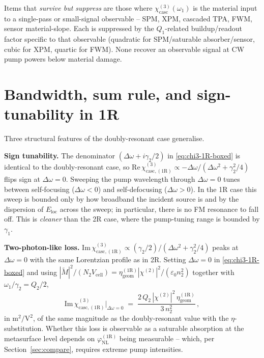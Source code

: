 \documentclass[11pt,a4paper]{article}
\newcommand{\eps}{\varepsilon}
\newcommand{\chitwo}{\chi^{(2)}}
\newcommand{\Dom}{\Delta\omega}
\newcommand{\chicascOneR}{\chi^{(3)}_{\text{casc},(1\mathrm R)}}
\newcommand{\chicasc}{\chi^{(3)}_{\text{casc}}}
\newcommand{\Vunit}{V_{\text{cell}}}
\begin{document}
Items that \emph{survive but suppress} are those where $\chicasc(\omega_1)$
is the material input to a single-pass or small-signal observable -- SPM,
XPM, cascaded TPA, FWM, sensor material-slope.  Each is suppressed by
the $Q_1$-related buildup/readout factor specific to that observable
(quadratic for SPM/saturable absorber/sensor, cubic for XPM, quartic for
FWM).  None recover an observable signal at CW pump powers below
material damage.

\section{Bandwidth, sum rule, and sign-tunability in 1R}\label{sec:sum-1R}

Three structural features of the doubly-resonant case generalise.

\textbf{Sign tunability.}  The denominator $(\Dom+i\gamma_2/2)$ in
\eqref{eq:chi3-1R-boxed} is identical to the doubly-resonant case, so
$\mathrm{Re}\,\chicascOneR\propto-\Dom/(\Dom^{2}+
\gamma_2^{2}/4)$ flips sign at $\Dom=0$.  Sweeping the pump wavelength
through $\Dom=0$ tunes between self-focusing ($\Dom<0$) and self-defocusing
($\Dom>0$).  In the 1R case this sweep is bounded only by how broadband the
incident source is and by the dispersion of $E_\text{loc}$ across the
sweep; in particular, there is no FM resonance to fall off.  This is
\emph{cleaner} than the 2R case, where the pump-tuning range is bounded by
$\gamma_1$.

\textbf{Two-photon-like loss.}
$\mathrm{Im}\,\chicascOneR\propto(\gamma_2/2)/
(\Dom^{2}+\gamma_2^{2}/4)$ peaks at $\Dom=0$ with the same Lorentzian
profile as in 2R.  Setting $\Dom=0$ in \eqref{eq:chi3-1R-boxed} and using
$|\widetilde M|^{2}/(N_2\Vunit)=\eta_\text{geom}^{(1\mathrm R)}|\chitwo|^{2}/(\eps_0 n_2^{2})$
together with $\omega_1/\gamma_2=Q_2/2$,
\begin{equation}
  \mathrm{Im}\,\chicascOneR\bigl|_{\Dom=0}
   \;=\;\frac{2\,Q_2\,|\chitwo|^{2}\,\eta_\text{geom}^{(1\mathrm R)}}{3\,n_2^{2}}\,,
  \label{eq:Im-chi3-1R}
\end{equation}
in $\mathrm{m^{2}/V^{2}}$, of the same magnitude as the doubly-resonant
value with the $\eta$-substitution.  Whether this loss is observable as a saturable
absorption at the metasurface level depends on
$\varphi_\text{NL}^{(1\mathrm R)}$ being measurable -- which, per
Section~\ref{sec:compare}, requires extreme pump intensities.
\end{document}

